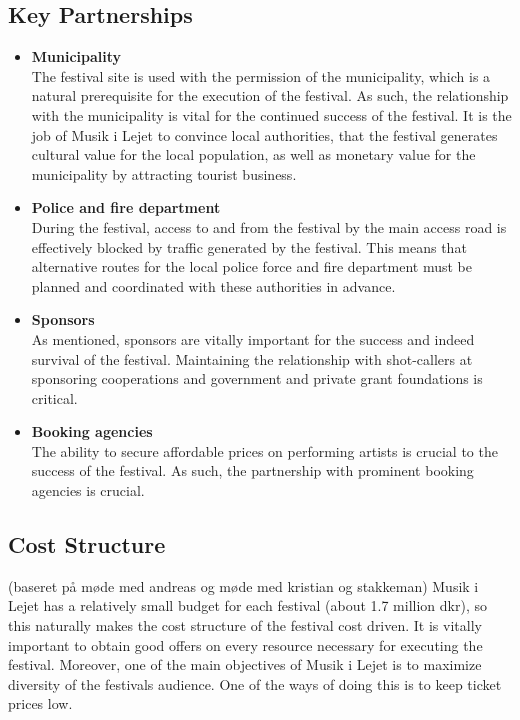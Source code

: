 \subsection{Key Partnerships} %
\label{sub:key_partnerships}
\begin{itemize}
(baseret på møde med andreas)
	\item \textbf{Municipality}\\
	The festival site is used with the permission of the municipality, which is a natural prerequisite for the execution of the festival. As such, the relationship with the municipality is vital for the continued success of the festival. It is the job of Musik i Lejet to convince local authorities, that the festival generates cultural value for the local population, as well as monetary value for the municipality  by attracting tourist business.
	\item \textbf{Police and fire department}\\
	During the festival, access to and from the festival by the main access road is effectively blocked by traffic generated by the festival. This means that alternative routes for the local police force and fire department must be planned and coordinated with these authorities in advance.
	\item \textbf{Sponsors}\\
	As mentioned, sponsors are vitally important for the success and indeed survival of the festival. Maintaining the relationship with shot-callers at sponsoring cooperations and government and private grant foundations is critical.
	\item \textbf{Booking agencies}\\
	The ability to secure affordable prices on performing artists is crucial to the success of the festival. As such, the partnership with prominent booking agencies is crucial.
\end{itemize}

\subsection{Cost Structure} %
\label{sub:cost_structure}
(baseret på møde med andreas og møde med kristian og stakkeman)
Musik i Lejet has a relatively small budget for each festival (about 1.7 million dkr), so this naturally makes the cost structure of the festival cost driven. It is vitally important to obtain good offers on every resource necessary for executing the festival. Moreover, one of the main objectives of Musik i Lejet is to maximize diversity of the festivals audience. One of the ways of doing this is to keep ticket prices low.